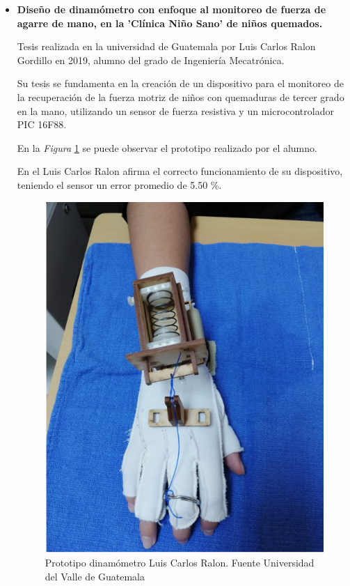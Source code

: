 \begin{itemize}
Mayra Lasteña Millingalli Ortega et al, en su artículo de revisión llamado 'Uso del dinamómetro para mejorar la fuerza de la mano del adulto mayor' publicado en la Revista Científica Arbitrada Multidisciplinaria PENTACIENCIAS en Octubre de 2023, realizan un trabajo de investigación revisando artículos en inglés y español publicados entre 2013 y 2022.
La población de estudio son pacientes geriátricos tratados en Terapia Ocupacional, las investigadoras exponen que actualmente en estas sesiones de terapia los pacientes son evaluados mediante métodos manuales como las escalas de registros, afirman que estos métodos son rudimentarios y no evidentes. \cite{Articulo_din}\footnote{Artículo que habla sobre el uso del dinamómetro\cite{Articulo_din}.}
\item \textbf{Diseño de dinamómetro con enfoque al monitoreo de fuerza de agarre de mano, en la 'Clínica Niño Sano' de niños quemados.}

    Tesis realizada en la universidad de Guatemala por Luis Carlos Ralon Gordillo en 2019, alumno del grado de  Ingeniería Mecatrónica. 

    Su tesis se fundamenta en la creación de un dispositivo para el monitoreo de la recuperación de la fuerza motriz de niños con quemaduras de tercer grado en la mano, utilizando un sensor de fuerza resistiva y un  microcontrolador PIC 16F88.

    En la \textit{Figura} \ref{fig:Prototipo dinamómetro Luis} se puede observar el prototipo realizado por el alumno.

    En el Luis Carlos Ralon afirma el correcto funcionamiento de su dispositivo, teniendo el sensor un  error promedio de 5.50 \%. \cite{ralon_gordillo_diseno_2019}

    \begin{figure}
        \centering
        \includegraphics[width=0.5\linewidth]{img/TesisGuatemala.png}
        \caption{Prototipo dinamómetro Luis Carlos Ralon. Fuente Universidad del Valle de Guatemala }
        \label{fig:Prototipo dinamómetro Luis}
    \end{figure}    
\end{itemize}